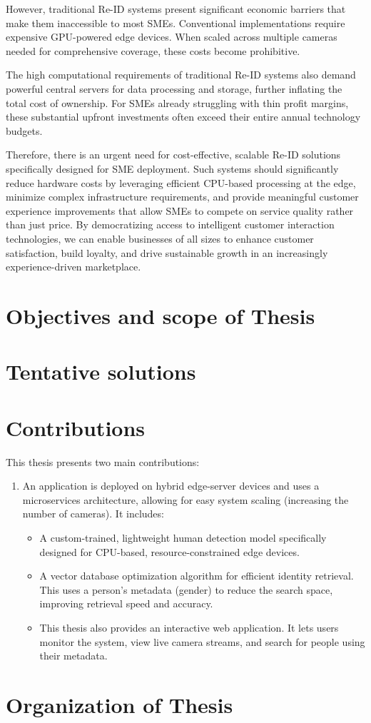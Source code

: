 \documentclass[../main.tex]{subfiles}
\begin{document}
However, traditional Re-ID systems present significant economic barriers that make them inaccessible to most SMEs. Conventional implementations require expensive GPU-powered edge devices. When scaled across multiple cameras needed for comprehensive coverage, these costs become prohibitive.

The high computational requirements of traditional Re-ID systems also demand powerful central servers for data processing and storage, further inflating the total cost of ownership. For SMEs already struggling with thin profit margins, these substantial upfront investments often exceed their entire annual technology budgets.

Therefore, there is an urgent need for cost-effective, scalable Re-ID solutions specifically designed for SME deployment. Such systems should significantly reduce hardware costs by leveraging efficient CPU-based processing at the edge, minimize complex infrastructure requirements, and provide meaningful customer experience improvements that allow SMEs to compete on service quality rather than just price. By democratizing access to intelligent customer interaction technologies, we can enable businesses of all sizes to enhance customer satisfaction, build loyalty, and drive sustainable growth in an increasingly experience-driven marketplace.

\section{Objectives and scope of Thesis} 
\label{sec:objectives}

\section{Tentative solutions}

\section{Contributions}
\label{sec:contribution}

This thesis presents two main contributions:
\begin{enumerate}
    \item An application is deployed on hybrid edge-server devices and uses a microservices architecture, allowing for easy system scaling (increasing the number of cameras). It includes:
    \begin{itemize}
        \item A custom-trained, lightweight human detection model specifically designed for CPU-based, resource-constrained edge devices.
        \item A vector database optimization algorithm for efficient identity retrieval. This uses a person's metadata (gender) to reduce the search space, improving retrieval speed and accuracy.
    \item This thesis also provides an interactive web application. It lets users monitor the system, view live camera streams, and search for people using their metadata.
\end{itemize} 
\end{enumerate}

\section{Organization of Thesis}
\label{sec:organize}
\end{document}
